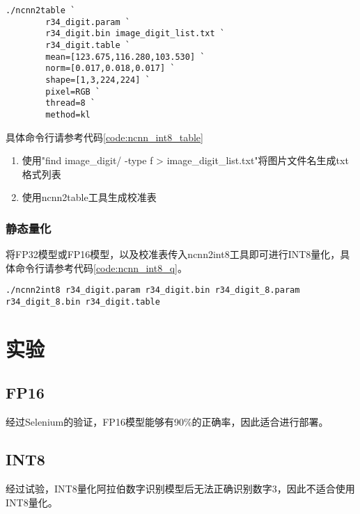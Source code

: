 \begin{lstlisting}[caption={生成校准表},label=code:ncnn_int8_table]
	./ncnn2table `
		r34_digit.param `
		r34_digit.bin image_digit_list.txt `
		r34_digit.table `
		mean=[123.675,116.280,103.530] `
		norm=[0.017,0.018,0.017] `
		shape=[1,3,224,224] `
		pixel=RGB `
		thread=8 `
		method=kl
\end{lstlisting}

具体命令行请参考代码\ref{code:ncnn_int8_table}

\begin{enumerate}
	\item 使用"find image\_digit/ -type f > image\_digit\_list.txt"将图片文件名生成txt格式列表
	\item 使用ncnn2table工具生成校准表
\end{enumerate}

\subsubsection{静态量化}

将FP32模型或FP16模型，以及校准表传入ncnn2int8工具即可进行INT8量化，具体命令行请参考代码\ref{code:ncnn_int8_q}。

\begin{lstlisting}[caption={NCNN INT8量化},label=code:ncnn_int8_q]
	./ncnn2int8 r34_digit.param r34_digit.bin r34_digit_8.param r34_digit_8.bin r34_digit.table
\end{lstlisting}

\section{实验}

\subsection{FP16}

经过Selenium的验证，FP16模型能够有90\%的正确率，因此适合进行部署。

\subsection{INT8}

经过试验，INT8量化阿拉伯数字识别模型后无法正确识别数字3，因此不适合使用INT8量化。
